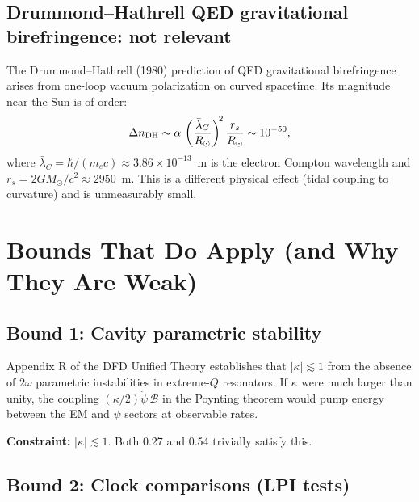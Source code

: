 \documentclass[11pt,a4paper]{article}
\theoremstyle{definition}
\begin{document}
\subsection{Drummond--Hathrell QED gravitational birefringence:
  not relevant}

The Drummond--Hathrell (1980) prediction of QED gravitational
birefringence arises from one-loop vacuum polarization on curved
spacetime.  Its magnitude near the Sun is of order:
\begin{equation}
\Delta n_{\rm DH} \sim \alpha\,
\left(\frac{\bar\lambda_C}{R_\odot}\right)^{\!2}
\frac{r_s}{R_\odot}
\sim 10^{-50},
\end{equation}
where $\bar\lambda_C = \hbar/(m_e c) \approx 3.86 \times 10^{-13}$~m
is the electron Compton wavelength and
$r_s = 2GM_\odot/c^2 \approx 2950$~m.
This is a different physical effect (tidal coupling to curvature)
and is unmeasurably small.


\section{Bounds That Do Apply (and Why They Are Weak)}
\label{sec:applicable}

\subsection{Bound 1: Cavity parametric stability}
\label{sec:cavity-stability}

Appendix R of the DFD Unified Theory establishes that
$|\kappa| \lesssim 1$ from the absence of $2\omega$ parametric
instabilities in extreme-$Q$ resonators.  If $\kappa$ were much
larger than unity, the coupling $(\kappa/2)\dot\psi\,\mathcal{B}$
in the Poynting theorem would pump energy between the EM and
$\psi$ sectors at observable rates.

\textbf{Constraint:} $|\kappa| \lesssim 1$.  Both 0.27 and 0.54
trivially satisfy this.

\subsection{Bound 2: Clock comparisons (LPI tests)}
\label{sec:clock}
\end{document}
